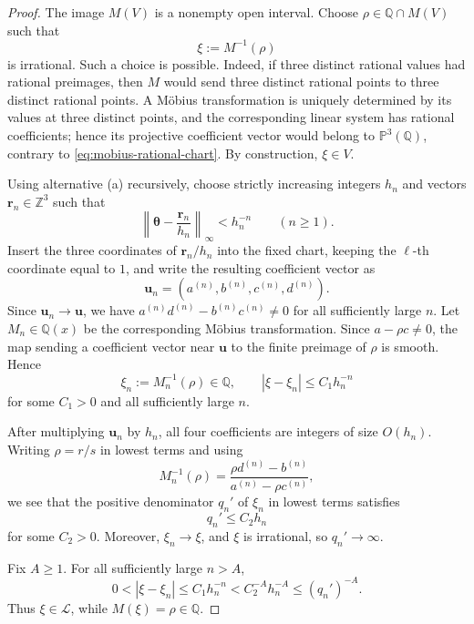 \documentclass[11pt]{amsart}
\numberwithin{equation}{section}
\theoremstyle{definition}
\theoremstyle{remark}
\newcommand{\Q}{\mathbb Q}
\newcommand{\Z}{\mathbb Z}
\newcommand{\Lio}{\mathscr L}
\begin{document}
\begin{proof}
The image \(M(V)\) is a nonempty open interval. Choose
\(\rho\in\Q\cap M(V)\) such that
\begin{equation}\label{eq:mobius-fiber-xi}
\xi:=M^{-1}(\rho)
\end{equation}
is irrational. Such a choice is possible. Indeed, if three distinct
rational values had rational preimages, then \(M\) would send three
distinct rational points to three distinct rational points. A M\"obius
transformation is uniquely determined by its values at three distinct
points, and the corresponding linear system has rational coefficients;
hence its projective coefficient vector would belong to
\(\mathbb P^3(\Q)\), contrary to
\eqref{eq:mobius-rational-chart}. By construction, \(\xi\in V\).

Using alternative \textup{(a)} recursively, choose strictly increasing
integers \(h_n\) and vectors \(\mathbf r_n\in\Z^3\) such that
\begin{equation}\label{eq:mobius-simultaneous-approximants}
\left\|\boldsymbol\theta-\frac{\mathbf r_n}{h_n}\right\|_\infty
<h_n^{-n}
\qquad(n\geq1).
\end{equation}
Insert the three coordinates of \(\mathbf r_n/h_n\) into the fixed
chart, keeping the \(\ell\)-th coordinate equal to \(1\), and write the
resulting coefficient vector as
\[
\mathbf u_n=(a^{(n)},b^{(n)},c^{(n)},d^{(n)}).
\]
Since \(\mathbf u_n\to\mathbf u\), we have
\(a^{(n)}d^{(n)}-b^{(n)}c^{(n)}\neq0\) for all sufficiently large \(n\).
Let \(M_n\in\Q(x)\) be the corresponding M\"obius transformation.
Since \(a-\rho c\neq0\), the map sending a coefficient vector near
\(\mathbf u\) to the finite preimage of \(\rho\) is smooth. Hence
\[
\xi_n:=M_n^{-1}(\rho)\in\Q,
\qquad
|\xi-\xi_n|\leq C_1h_n^{-n}
\]
for some \(C_1>0\) and all sufficiently large \(n\).

After multiplying \(\mathbf u_n\) by \(h_n\), all four coefficients are
integers of size \(O(h_n)\). Writing \(\rho=r/s\) in lowest terms and
using
\[
M_n^{-1}(\rho)=
\frac{\rho d^{(n)}-b^{(n)}}{a^{(n)}-\rho c^{(n)}},
\]
we see that the positive denominator \(q_n'\) of \(\xi_n\) in lowest
terms satisfies
\begin{equation}\label{eq:mobius-fiber-denominator}
q_n'\leq C_2h_n
\end{equation}
for some \(C_2>0\). Moreover, \(\xi_n\to\xi\), and \(\xi\) is
irrational, so \(q_n'\to\infty\).

Fix \(A\geq1\). For all sufficiently large \(n>A\),
\[
0<|\xi-\xi_n|
\leq C_1h_n^{-n}
<C_2^{-A}h_n^{-A}
\leq(q_n')^{-A}.
\]
Thus \(\xi\in\Lio\), while \(M(\xi)=\rho\in\Q\).
\end{proof}
\end{document}

